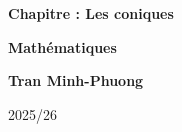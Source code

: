 \begin{titlepage}
     \begin{center}
       \vspace*{1cm}
        \huge
       \textbf{Chapitre \hspace{1cm} : Les coniques}\\ %
              \vspace{1.5cm}


       \Large\textbf{Mathématiques}
 
      
       \vspace{15cm}
        \large
       
       \textbf{Tran Minh-Phuong}
 
       \vfill
 
      
 
       \vspace{0.8cm}
 
       
        \normalsize
       
       2025/26
 
   \end{center}

\end{titlepage}

\shipout\null
